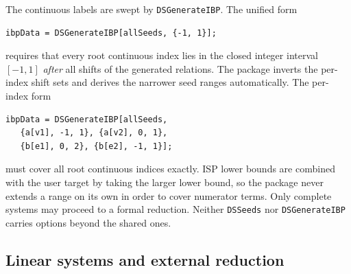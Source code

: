 \documentclass[11pt,a4paper]{article}
\begin{document}
The continuous labels are swept by \texttt{DSGenerateIBP}. The unified form
\begin{verbatim}
ibpData = DSGenerateIBP[allSeeds, {-1, 1}];
\end{verbatim}
requires that every root continuous index lies in the closed integer interval $[-1,1]$ \emph{after}
all shifts of the generated relations. The package inverts the per-index shift sets and derives the
narrower seed ranges automatically. The per-index form
\begin{verbatim}
ibpData = DSGenerateIBP[allSeeds,
   {a[v1], -1, 1}, {a[v2], 0, 1},
   {b[e1], 0, 2}, {b[e2], -1, 1}];
\end{verbatim}
must cover all root continuous indices exactly. ISP lower bounds are combined with the user target
by taking the larger lower bound, so the package never extends a range on its own in order to cover
numerator terms. Only complete systems may proceed to a formal reduction. Neither \texttt{DSSeeds}
nor \texttt{DSGenerateIBP} carries options beyond the shared ones.

\subsection{Linear systems and external reduction}
\label{sec:linear}
\end{document}
